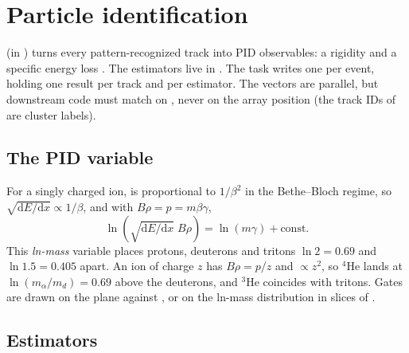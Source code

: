 \chapter{Particle identification}
\label{ch:pid}

 (in ) turns every pattern-recognized track into PID observables: a
rigidity \brho{} and a specific energy loss \sqdedx. The estimators live in . The task writes
one  per event, holding one result per track and per estimator. The vectors are parallel, but
downstream code must match on , never on the array position (the track IDs of
 are cluster labels).

\section{The PID variable}

For a singly charged ion, \dedx{} is proportional to $1/\beta^2$ in the Bethe--Bloch regime, so
$\sqrt{\mathrm{d}E/\mathrm{d}x}\propto 1/\beta$, and with $B\rho = p = m\beta\gamma$,
\begin{equation}
  \ln\!\left(\sqrt{\mathrm{d}E/\mathrm{d}x}\;B\rho\right) = \ln(m\gamma) + \text{const}.
\end{equation}
This \emph{ln-mass} variable places protons, deuterons and tritons $\ln 2 = 0.69$ and $\ln 1.5 = 0.405$ apart. An
ion of charge $z$ has $B\rho = p/z$ and \dedx{} $\propto z^2$, so $^4$He lands at $\ln(m_\alpha/m_d) = 0.69$ above the
deuterons, and $^3$He coincides with tritons. Gates are drawn on the plane \sqdedx{} against \brho, or on the ln-mass
distribution in slices of \brho.

\section{Estimators}

